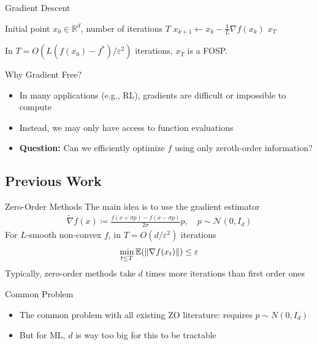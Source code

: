 \documentclass[10pt]{beamer}
\def \ve{\varepsilon}
\newcommand{\E}{\mathbb{E}\qty}
\renewcommand{\grad}{\nabla}
\newcommand{\1}{\mathbbm{1}}
\begin{document}
\begin{frame}{Gradient Descent}
    \begin{algorithm}[H]
\caption{Gradient Descent}
\label{alg:gradient-descent}
\begin{algorithmic}[1]
    \Require Initial point $x_0 \in \mathbb{R}^d$,
             number of iterations $T$
        \State $x_{k+1} \gets x_k - \frac 1L \nabla f(x_k)$
    \EndFor
    \State \Return $x_T$
\end{algorithmic}
\end{algorithm}

\begin{theorem}[]
    In $T = O(L(f(x_0) - f^*) / \ve^2)$ iterations, $x_T$ is a FOSP.
\end{theorem}
\end{frame}

\begin{frame}{Why Gradient Free?}
    \begin{itemize}
    \item In many applications (e.g., RL), gradients are difficult or impossible to compute
    \item Instead, we may only have access to function evaluations
    \item \textbf{Question:} Can we efficiently optimize $f$ using only zeroth-order information?
\end{itemize}
\end{frame}

\subsection{Previous Work}
\begin{frame}{Zero-Order Methods}
    The main idea is to use the gradient estimator
    \begin{align*}
        \tilde \grad f(x) \coloneqq \frac{f(x + \sigma p) - f(x - \sigma p)}{2\sigma} p, \quad p \sim \mathcal N(0,I_d)
    \end{align*}
    For $L$-smooth non-convex $f$, in $T = O(d/\ve^2)$ iterations \cite{ghadimi2013stochastic} \cite{nesterov2017random}
    \begin{align*}
        \min_{t \leq T} \E(\| \grad f(x_t) \| ) \leq \ve
    \end{align*}
    Typically, zero-order methods take $d$ times more iterations than first order ones
\end{frame} 

\begin{frame}{Common Problem}
    \begin{itemize}
        \item The common problem with all existing ZO literature: requires $p \sim N(0, I_d)$ 
        \item But for ML, $d$ is way too big for this to be tractable
    \end{itemize}
\end{frame}
\end{document}
